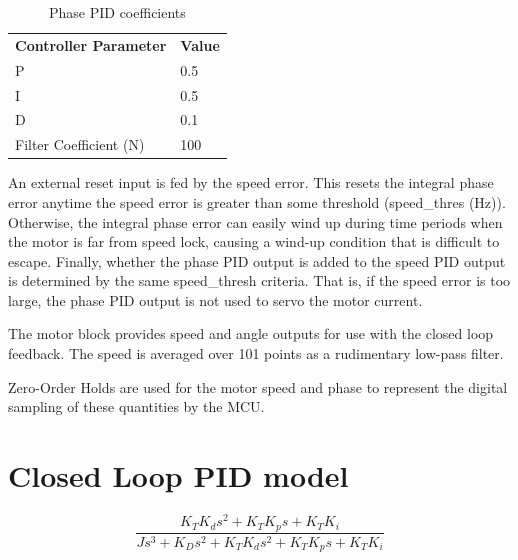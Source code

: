 \documentclass[11pt]{article} %
\begin{document}
\begin{table}[h]
\centering
\begin{tabular}{l | l }
\textbf{Controller Parameter} & \textbf{Value} \\
P & 0.5 \\
I & 0.5 \\
D & 0.1 \\
Filter Coefficient (N) & 100
\end{tabular}
\caption{Phase PID coefficients}
\label{tab:PhasePIDcoeffs}
\end{table}

\noindent An external reset input is fed by the speed error. This resets the integral phase error anytime the speed error is greater than some threshold (speed\_thres (Hz)). Otherwise, the integral phase error can easily wind up during time periods when the motor is far from speed lock, causing a wind-up condition that is difficult to escape. Finally, whether the phase PID output is added to the speed PID output is determined by the same speed\_thresh criteria. That is, if the speed error is too large, the phase PID output is not used to servo the motor current.

The motor block provides speed and angle outputs for use with the closed loop feedback. The speed is averaged over 101 points as a rudimentary low-pass filter.

Zero-Order Holds are used for the motor speed and phase to represent the digital sampling of these quantities by the MCU.

\section{Closed Loop PID model}
\begin{equation}
\frac{K_T K_d s^2 + K_T K_p s + K_T K_i } {J s^3 + K_D s^2 + K_T K_d s^2 + K_T K_p s + K_T K_i}
\end{equation}
\end{document}
